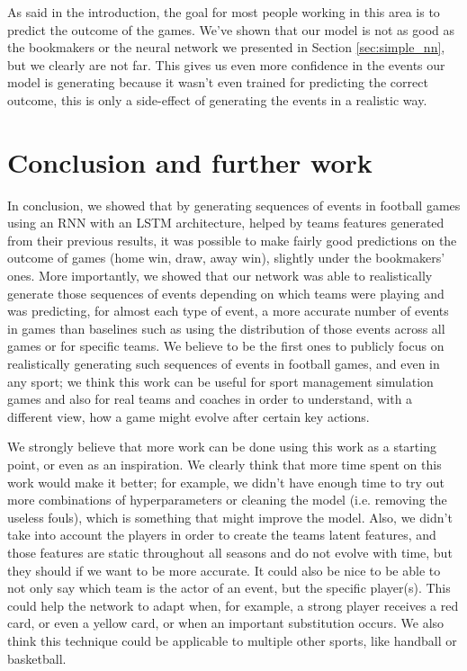 \documentclass[10pt,conference,onecolumn]{IEEEtran}
\begin{document}
As said in the introduction, the goal for most people working in this area is to predict the outcome of the games. We've shown that our model is not as good as the bookmakers or the neural network we presented in Section \ref{sec:simple_nn}, but we clearly are not far. This gives us even more confidence in the events our model is generating because it wasn't even trained for predicting the correct outcome, this is only a side-effect of generating the events in a realistic way.

\section{Conclusion and further work} \label{sec:conclusion}
In conclusion, we showed that by generating sequences of events in football games using an RNN with an LSTM architecture, helped by teams features generated from their previous results, it was possible to make fairly good predictions on the outcome of games (home win, draw, away win), slightly under the bookmakers' ones. More importantly, we showed that our network was able to realistically generate those sequences of events depending on which teams were playing and was predicting, for almost each type of event, a more accurate number of events in games than baselines such as using the distribution of those events across all games or for specific teams. We believe to be the first ones to publicly focus on realistically generating such sequences of events in football games, and even in any sport; we think this work can be useful for sport management simulation games and also for real teams and coaches in order to understand, with a different view, how a game might evolve after certain key actions.

We strongly believe that more work can be done using this work as a starting point, or even as an inspiration. We clearly think that more time spent on this work would make it better; for example, we didn't have enough time to try out more combinations of hyperparameters or cleaning the model (i.e. removing the useless fouls), which is something that might improve the model. Also, we didn't take into account the players in order to create the teams latent features, and those features are static throughout all seasons and do not evolve with time, but they should if we want to be more accurate. It could also be nice to be able to not only say which team is the actor of an event, but the specific player(s). This could help the network to adapt when, for example, a strong player receives a red card, or even a yellow card, or when an important substitution occurs. We also think this technique could be applicable to multiple other sports, like handball or basketball.
\end{document}
